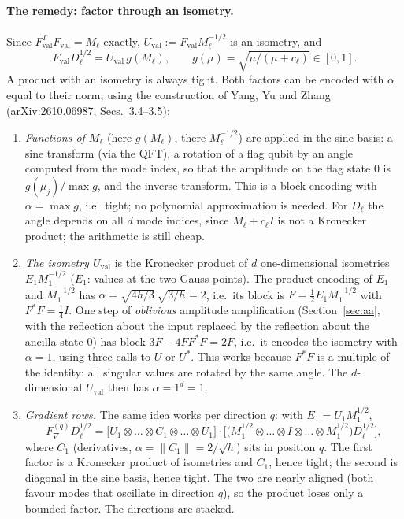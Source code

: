\documentclass[11pt,a4paper]{article}
\begin{document}
\paragraph{The remedy: factor through an isometry.} Since $F_{\mathrm{val}}^TF_{\mathrm{val}}=M_\ell$
exactly, $U_{\mathrm{val}}:=F_{\mathrm{val}}M_\ell^{-1/2}$ is an isometry, and
\[
F_{\mathrm{val}}D_\ell^{1/2}=U_{\mathrm{val}}\,g(M_\ell),\qquad g(\mu)=\sqrt{\mu/(\mu+c_\ell)}\in[0,1].
\]
A product with an isometry is always tight. Both factors can be encoded with
$\alpha$ equal to their norm, using the construction of Yang, Yu and Zhang
(arXiv:2610.06987, Secs.~3.4--3.5):
\begin{enumerate}
\item \emph{Functions of $M_\ell$} (here $g(M_\ell)$, there $M_\ell^{-1/2}$) are applied in
  the sine basis: a sine transform (via the QFT), a rotation of a flag
  qubit by an angle computed from the mode index, so that the amplitude on
  the flag state $0$ is $g(\mu_j)/\max g$, and the inverse transform. This is a
  block encoding with $\alpha=\max g$, i.e.\ tight; no polynomial
  approximation is needed. For $D_\ell$ the angle depends on all $d$ mode
  indices, since $M_\ell+c_\ell I$ is not a Kronecker product; the arithmetic is
  still cheap.
\item \emph{The isometry $U_{\mathrm{val}}$} is the Kronecker product of $d$ one-dimensional
  isometries $E_1M_1^{-1/2}$ ($E_1$: values at the two Gauss points). The product
  encoding of $E_1$ and $M_1^{-1/2}$ has $\alpha=\sqrt{4h/3}\,\sqrt{3/h}=2$, i.e.\ its block is
  $F=\tfrac12E_1M_1^{-1/2}$ with $F^*F=\tfrac14I$. One step of \emph{oblivious} amplitude
  amplification (Section~\ref{sec:aa}, with the reflection about the input
  replaced by the reflection about the ancilla state $0$) has block
  $3F-4FF^*F=2F$, i.e.\ it encodes the isometry with $\alpha=1$, using three calls
  to $U$ or $U^*$. This works because $F^*F$ is a multiple of the identity:
  all singular values are rotated by the same angle. The $d$-dimensional
  $U_{\mathrm{val}}$ then has $\alpha=1^d=1$.
\item \emph{Gradient rows.} The same idea works per direction $q$: with
  $E_1=U_1M_1^{1/2}$,
  \[
  F_\nabla^{(q)}D_\ell^{1/2}=\big[U_1\otimes\dots\otimes C_1\otimes\dots\otimes U_1\big]\cdot
  \Big[\big(M_1^{1/2}\otimes\dots\otimes I\otimes\dots\otimes M_1^{1/2}\big)D_\ell^{1/2}\Big],
  \]
  where $C_1$ (derivatives, $\alpha=\|C_1\|=2/\sqrt h$) sits in position $q$. The first
  factor is a Kronecker product of isometries and $C_1$, hence tight; the
  second is diagonal in the sine basis, hence tight. The two are nearly
  aligned (both favour modes that oscillate in direction $q$), so the
  product loses only a bounded factor. The directions are stacked.
\end{enumerate}
\end{document}
